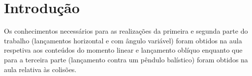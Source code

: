 
\chapter{Introdução}
\label{ch:introducao}
{

Os conhecimentos necessários para as realizações da primeira e segunda parte do trabalho (lançamentos horizontal e com ângulo variável) foram obtidos na aula respetiva aos conteúdos do momento linear e lançamento oblíquo enquanto que para a terceira parte (lançamento contra um pêndulo balístico) foram obtidos na aula relativa às colisões.
}
